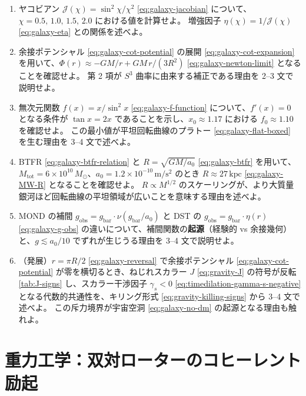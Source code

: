\documentclass[dvipdfmx,a4paper,oneside]{jsbook}
\numberwithin{equation}{chapter}
\begin{document}
\begin{enumerate}[leftmargin=2em]
  \item ヤコビアン \(\mathcal{J}(\chi) = \sin^2\chi / \chi^2\) \eqref{eq:galaxy-jacobian} について、\(\chi = 0.5,\, 1.0,\, 1.5,\, 2.0\) における値を計算せよ。
  増強因子 \(\eta(\chi) = 1/\mathcal{J}(\chi)\) \eqref{eq:galaxy-eta} との関係を述べよ。

  \item 余接ポテンシャル \eqref{eq:galaxy-cot-potential} の展開 \eqref{eq:galaxy-cot-expansion} を用いて、\(\Phi(r) \approx -GM/r + GM\,r/(3R^2)\) \eqref{eq:galaxy-newton-limit} となることを確認せよ。
  第 2 項が \(S^3\) 曲率に由来する補正である理由を 2--3 文で説明せよ。

  \item 無次元関数 \(f(x) = x/\sin^2 x\) \eqref{eq:galaxy-f-function} について、\(f'(x) = 0\) となる条件が \(\tan x = 2x\) であることを示し、\(x_0 \approx 1.17\) における \(f_0 \approx 1.10\) を確認せよ。
  この最小値が平坦回転曲線のプラトー \eqref{eq:galaxy-flat-boxed} を生む理由を 3--4 文で述べよ。

  \item BTFR \eqref{eq:galaxy-btfr-relation} と \(R = \sqrt{GM/a_0}\) \eqref{eq:galaxy-btfr} を用いて、\(M_{\mathrm{tot}} = 6 \times 10^{10}\,M_\odot\)、\(a_0 = 1.2 \times 10^{-10}\,\mathrm{m/s^2}\) のとき \(R \approx 27\,\mathrm{kpc}\) \eqref{eq:galaxy-MW-R} となることを確認せよ。
  \(R \propto M^{1/2}\) のスケーリングが、より大質量銀河ほど回転曲線の平坦領域が広いことを意味する理由を述べよ。

  \item MOND の補間 \(g_{\mathrm{obs}} = g_{\mathrm{bar}} \cdot \nu(g_{\mathrm{bar}}/a_0)\) と DST の \(g_{\mathrm{obs}} = g_{\mathrm{bar}} \cdot \eta(r)\) \eqref{eq:galaxy-g-obs} の違いについて、補間関数の\textbf{起源}（経験的 vs 余接幾何）と、\(g \lesssim a_0/10\) でずれが生じうる理由を 3--4 文で説明せよ。

  \item （発展）\(r = \pi R/2\) \eqref{eq:galaxy-reversal} で余接ポテンシャル \eqref{eq:galaxy-cot-potential} が零を横切るとき、ねじれスカラー \(J\) \eqref{eq:gravity-J} の符号が反転 \eqref{tab:J-signs} し、スカラー干渉因子 \(\gamma_s < 0\) \eqref{eq:timedilation-gamma-s-negative} となる代数的共通性を、キリング形式 \eqref{eq:gravity-killing-signs} から 3--4 文で述べよ。
  この斥力境界が宇宙空洞 \eqref{eq:galaxy-no-dm} の起源となる理由も触れよ。
\end{enumerate}

\chapter{重力工学：双対ローターのコヒーレント励起}
\end{document}
